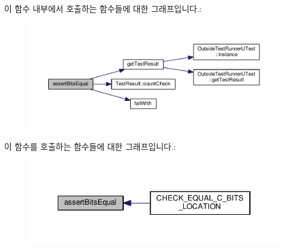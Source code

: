 이 함수 내부에서 호출하는 함수들에 대한 그래프입니다.\+:
\nopagebreak
\begin{figure}[H]
\begin{center}
\leavevmode
\includegraphics[width=350pt]{class_utest_shell_a95aea59049d74e55ea6c4f93e1102856_cgraph}
\end{center}
\end{figure}




이 함수를 호출하는 함수들에 대한 그래프입니다.\+:
\nopagebreak
\begin{figure}[H]
\begin{center}
\leavevmode
\includegraphics[width=334pt]{class_utest_shell_a95aea59049d74e55ea6c4f93e1102856_icgraph}
\end{center}
\end{figure}


